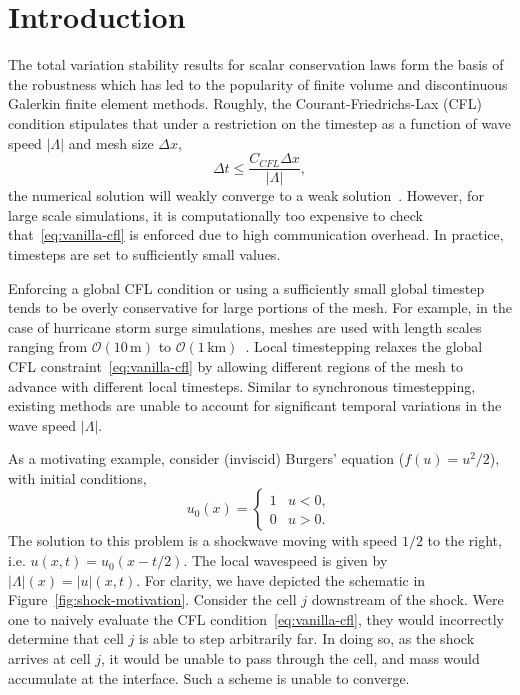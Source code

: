 \section{Introduction}
\label{sec:intro}

The total variation stability results for scalar conservation laws form the basis of the robustness which has led to the popularity of finite volume and discontinuous Galerkin finite element methods. Roughly, the Courant-Friedrichs-Lax (CFL) condition stipulates that under a restriction on the timestep as a function of wave speed $|\Lambda|$ and mesh size $\Delta x$,
\begin{equation}
\Delta t \le \frac{C_{CFL} \Delta x}{|\Lambda|},
\label{eq:vanilla-cfl}
\end{equation}
the numerical solution will weakly converge to a weak solution~\cite{LeVeque1992}. However, for large scale simulations, it is computationally too expensive to check that~\eqref{eq:vanilla-cfl} is enforced due to high communication overhead. In practice, timesteps are set to sufficiently small values.

Enforcing a global CFL condition or using a sufficiently small global timestep tends to be overly conservative for large portions of the mesh. For example, in the case of hurricane storm surge simulations, meshes are used with length scales ranging from $\mathcal{O}(10\,\mathrm{m})$ to $\mathcal{O}(1\,\mathrm{km})$~\cite{Dawson2011}. Local timestepping relaxes the global CFL constraint~\eqref{eq:vanilla-cfl} by allowing different regions of the mesh to advance with different local timesteps. Similar to synchronous timestepping, existing methods are unable to account for significant temporal variations in the wave speed $|\Lambda|$.


As a motivating example, consider (inviscid) Burgers' equation ($f(u) = u^2/2$), with initial conditions,
\begin{equation}
u_0(x) = \begin{cases}
1 & u < 0,\\
0 & u > 0.
\end{cases}
\label{eq:shock-ics-mot}
\end{equation}
The solution to this problem is a shockwave moving with speed $1/2$ to the right, i.e. $u(x,t) = u_0(x - t/2)$. The local wavespeed is given by $|\Lambda|(x) = |u|(x,t)$. For clarity, we have depicted the schematic in Figure~\ref{fig:shock-motivation}. Consider the cell $j$ downstream of the shock. Were one to naively evaluate the CFL condition~\eqref{eq:vanilla-cfl}, they would incorrectly determine that cell $j$ is able to step arbitrarily far. In doing so, as the shock arrives at cell $j$, it would be unable to pass through the cell, and mass would accumulate at the interface. Such a scheme is unable to converge.

